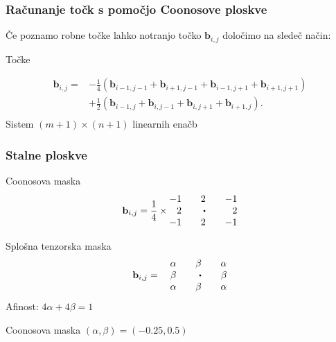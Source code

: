 \documentclass{beamer}
\newcommand\sbullet[1][.5]{\mathbin{\vcenter{\hbox{\scalebox{#1}{$\bullet$}}}}}
\begin{document}
\begin{frame}
\frametitle{Računanje točk s pomočjo Coonosove ploskve}
Če poznamo robne točke lahko notranjo točko $\mathbf{b}_{i,j}$ določimo na sledeč način: 
\begin{block}{Točke}

    \begin{align*}
        \mathbf{b}_{i,j} =& -\frac{1}{4}(\mathbf{b}_{i-1,j-1} + \mathbf{b}_{i+1,j-1} +
           \mathbf{b}_{i-1,j+1} + \mathbf{b}_{i+1,j+1}) \\
           &+\frac{1}{2}(\mathbf{b}_{i-1,j} + \mathbf{b}_{i,j-1}+
           \mathbf{b}_{i,j+1} + \mathbf{b}_{i+1,j}).\\
     \end{align*}
     Sistem $(m+1)\times(n+1)$ linearnih enačb
\end{block}
\end{frame}

\begin{frame}
\frametitle{Stalne ploskve}
\begin{block}{Coonosova maska}
    $$
    \mathbf{b}_{i,j} = \frac{1}{4} \times 
    \begin{matrix*}[r]
    -1 && 2 && -1 \\
    2 && \sbullet && 2\\
    -1 && 2 && -1
    \end{matrix*}
    $$
\end{block}

\begin{block}{Splošna tenzorska maska}
    $$
    \mathbf{b}_{i,j} =  \quad 
    \begin{matrix*}[r]
    \alpha && \beta && \alpha \\
    \beta && \sbullet && \beta \\
    \alpha && \beta && \alpha
    \end{matrix*}
    $$
    Afinost: $4\alpha + 4\beta = 1$
\end{block}

\begin{block}{Coonosova maska}
    $(\alpha, \beta) = (-0.25, 0.5)$
\end{block}
\end{frame}
\end{document}
